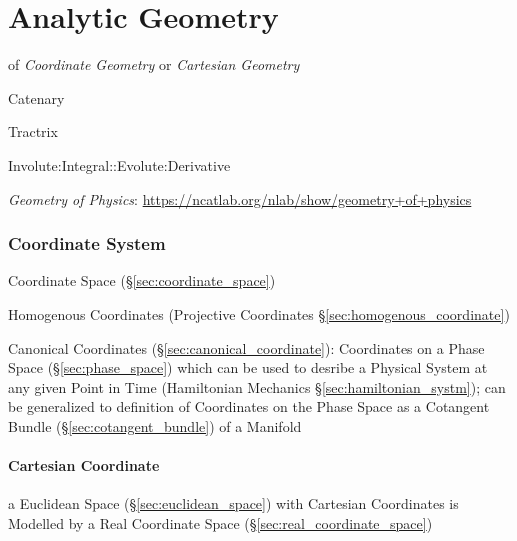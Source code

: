 \part{Analytic Geometry}\label{sec:analytic_geometry}


of \emph{Coordinate Geometry} or \emph{Cartesian Geometry}

Catenary

Tractrix

Involute:Integral::Evolute:Derivative


\fist \emph{Geometry of Physics}:
\url{https://ncatlab.org/nlab/show/geometry+of+physics}



\section{Coordinate System}\label{sec:coordinate_system}

Coordinate Space (\S\ref{sec:coordinate_space})

Homogenous Coordinates (Projective Coordinates
\S\ref{sec:homogenous_coordinate})

\fist Canonical Coordinates (\S\ref{sec:canonical_coordinate}): Coordinates on
a Phase Space (\S\ref{sec:phase_space}) which can be used to desribe a Physical
System at any given Point in Time (Hamiltonian Mechanics
\S\ref{sec:hamiltonian_systm}); can be generalized to definition of Coordinates
on the Phase Space as a Cotangent Bundle (\S\ref{sec:cotangent_bundle}) of a
Manifold


\subsection{Cartesian Coordinate}\label{sec:cartesian_coordinate}

a Euclidean Space (\S\ref{sec:euclidean_space}) with Cartesian Coordinates is
Modelled by a Real Coordinate Space (\S\ref{sec:real_coordinate_space})

